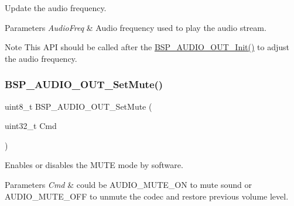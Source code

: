 Update the audio frequency. 


\begin{DoxyParams}{Parameters}
{\em Audio\+Freq} & Audio frequency used to play the audio stream. \\
\hline
\end{DoxyParams}
\begin{DoxyNote}{Note}
This A\+PI should be called after the \mbox{\hyperlink{group___s_t_m32_f4___d_i_s_c_o_v_e_r_y___a_u_d_i_o___o_u_t___private___functions_gae713c698a93ff492424c6a8363f53bcc}{B\+S\+P\+\_\+\+A\+U\+D\+I\+O\+\_\+\+O\+U\+T\+\_\+\+Init()}} to adjust the audio frequency. 
\end{DoxyNote}
\mbox{\label{group___s_t_m32_f4___d_i_s_c_o_v_e_r_y___a_u_d_i_o___o_u_t___private___functions_ga6f0fdfb8396ba31eaebb8ff530de3dd3}} 
\subsubsection{\texorpdfstring{B\+S\+P\+\_\+\+A\+U\+D\+I\+O\+\_\+\+O\+U\+T\+\_\+\+Set\+Mute()}{BSP\_AUDIO\_OUT\_SetMute()}}
{\footnotesize\ttfamily uint8\+\_\+t B\+S\+P\+\_\+\+A\+U\+D\+I\+O\+\_\+\+O\+U\+T\+\_\+\+Set\+Mute (\begin{DoxyParamCaption}\item[{uint32\+\_\+t}]{Cmd }\end{DoxyParamCaption})}



Enables or disables the M\+U\+TE mode by software. 


\begin{DoxyParams}{Parameters}
{\em Cmd} & could be A\+U\+D\+I\+O\+\_\+\+M\+U\+T\+E\+\_\+\+ON to mute sound or A\+U\+D\+I\+O\+\_\+\+M\+U\+T\+E\+\_\+\+O\+FF to unmute the codec and restore previous volume level. \\
\hline
\end{DoxyParams}

